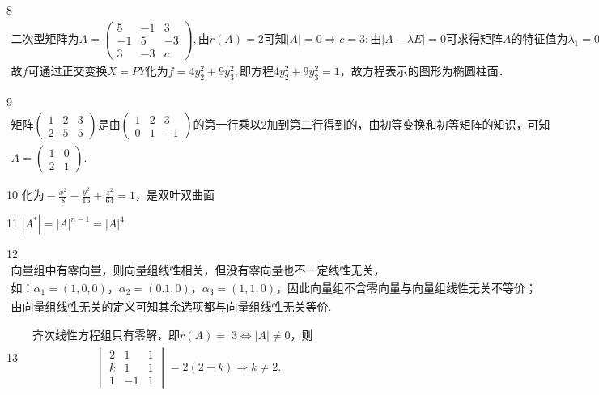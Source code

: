 8
$\begin{array}{l}\mathrm{二次型矩阵为}A=\begin{pmatrix}5&-1&3\\-1&5&-3\\3&-3&c\end{pmatrix},由r(A)=2\mathrm{可知}\left|A\right|=0\Rightarrow c=3;由\left|A-\lambda E\right|=0\mathrm{可求得矩阵}A\mathrm{的特征值为}\lambda_1=0,\lambda_2=4,\lambda_3=9\\故f\mathrm{可通过正交变换}X=PY\mathrm{化为}f=4y_2^2+9y_3^2,\mathrm{即方程}4y_2^2+9y_3^2=1，\mathrm{故方程表示的图形为椭圆柱面}．\end{array}$


9
$\begin{array}{l}\mathrm{矩阵}\begin{pmatrix}1&2&3\\2&5&5\end{pmatrix}\mathrm{是由}\begin{pmatrix}1&2&3\\0&1&-1\end{pmatrix}\mathrm{的第一行乘以}2\mathrm{加到第二行得到的}，\mathrm{由初等变换和初等矩阵的知识}，\mathrm{可知}\\A=\begin{pmatrix}1&0\\2&1\end{pmatrix}.\end{array}$


10
$\text{化为}-\frac{x^2}8-\frac{y^2}{16}+\frac{z^2}{64}=1\text{，是双叶双曲面}$


11
$\left|A^\ast\right|=\left|A\right|^{n-1}=\left|A\right|^4$


12
$\begin{array}{l}\mathrm{向量组中有零向量}，\mathrm{则向量组线性相关}，\mathrm{但没有零向量也不一定线性无关}，\\如：\alpha_1=(1,0,0)，\alpha_2=(0.1,0)，\alpha_3=(1,1,0)，\mathrm{因此向量组不含零向量与向量组线性无关不等价}；\\\mathrm{由向量组线性无关的定义可知其余选项都与向量组线性无关等价}.\end{array}$


13
$\begin{array}{l}\;\;\mathrm{齐次线性方程组只有零解}，即r(A)=\;3\Leftrightarrow\left|A\right|\neq0，则\\\;\;\;\;\;\;\;\;\;\;\;\;\;\;\;\;\;\;\;\;\;\;\begin{vmatrix}2&1&1\\k&1&1\\1&-1&1\end{vmatrix}=2(2-k)\Rightarrow k\neq2.\end{array}$


